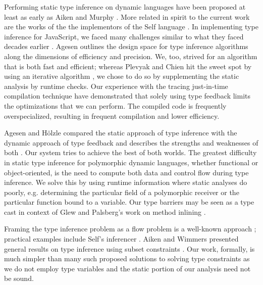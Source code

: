 Performing static type inference on dynamic languages have been proposed at
least as early as Aiken and Murphy \cite{Aiken91}. More related in spirit to
the current work are the works of the the implementors of the Self language
\cite{Ungar87}. In implementing type inference for JavaScript, we faced many
challenges similar to what they faced decades earlier \cite{Ungar92,
  Agesen94}. Agesen outlines the design space for type inference algorithms
along the dimensions of efficiency and precision. We, too, strived for an
algorithm that is both fast and efficient; whereas Plevyak and Chien hit the
sweet spot by using an iterative algorithm \cite{Plevyak93}, we chose to do so
by supplementing the static analysis by runtime checks. Our experience with
the tracing just-in-time compilation technique \cite{GalVEE09, GalPLDI09} have
demonstrated that solely using type feedback limits the optimizations that we
can perform. The compiled code is frequently overspecialized, resulting
in frequent compilation and lower efficiency.

Agesen and H\"olzle compared the static approach of type inference with the
dynamic approach of type feedback and describes the strengths and weaknesses
of both \cite{Agesen95}. Our system tries to achieve the best of both
worlds. The greatest difficulty in static type inference for polymorphic
dynamic languages, whether functional or object-oriented, is the need to
compute both data and control flow during type inference. We solve this by
using runtime information where static analyses do poorly,
e.g. determining the particular field of a polymorphic receiver or the
particular function bound to a variable. Our type barriers may be seen as a
type cast in context of Glew and
Palsberg's work on method inlining \cite{Glew02}.

Framing the type inference problem as a flow problem is a well-known approach
\cite{Oxhoj92, Palsberg91}; practical examples include Self's inferencer
\cite{Agesen93TI}.
Aiken and Wimmers presented general results on
type inference using subset constraints \cite{Aiken93}.
Our work, formally, is much simpler than many such
proposed solutions to solving type constraints as we do not employ type
variables and the static portion of our analysis need not be sound.

